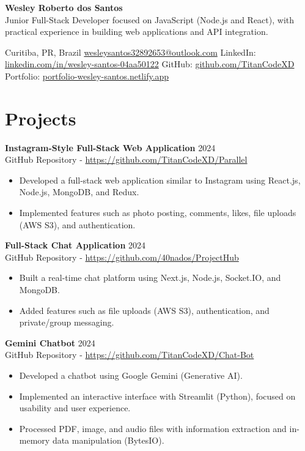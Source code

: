 \documentclass[a4paper, 10pt]{article}
\begin{document}
\begin{center}
    {\Huge \textbf{Wesley Roberto dos Santos}} \\
    \vspace{0.3em}
    \small{Junior Full-Stack Developer focused on JavaScript (Node.js and React), with practical experience in building web applications and API integration.}

    \vspace{0.6em}
    Curitiba, PR, Brazil \quad\textbullet\quad 
    \href{mailto:wesleysantos32892653@outlook.com}{wesleysantos32892653@outlook.com} \quad\textbullet\quad
    LinkedIn: \href{https://www.linkedin.com/in/wesley-santos-04aa50122}{linkedin.com/in/wesley-santos-04aa50122} \quad\textbullet\quad
    GitHub: \href{https://github.com/TitanCodeXD}{github.com/TitanCodeXD} \quad\textbullet\quad
    Portfolio: \href{https://portfolio-wesley-santos.netlify.app}{portfolio-wesley-santos.netlify.app}
\end{center}

\section{Projects}
\textbf{Instagram-Style Full-Stack Web Application} \hfill 2024 \\
GitHub Repository - \href{https://github.com/TitanCodeXD/Parallel}{https://github.com/TitanCodeXD/Parallel}
\begin{itemize}
    \item Developed a full-stack web application similar to Instagram using React.js, Node.js, MongoDB, and Redux.
    \item Implemented features such as photo posting, comments, likes, file uploads (AWS S3), and authentication.
\end{itemize}

\medskip
\textbf{Full-Stack Chat Application} \hfill 2024 \\
GitHub Repository - \href{https://github.com/40nados/ProjectHub}{https://github.com/40nados/ProjectHub}
\begin{itemize}
    \item Built a real-time chat platform using Next.js, Node.js, Socket.IO, and MongoDB.
    \item Added features such as file uploads (AWS S3), authentication, and private/group messaging.
\end{itemize}

\medskip
\textbf{Gemini Chatbot} \hfill 2024 \\
GitHub Repository - \href{https://github.com/TitanCodeXD/Chat-Bot}{https://github.com/TitanCodeXD/Chat-Bot}
\begin{itemize}
    \item Developed a chatbot using Google Gemini (Generative AI).
    \item Implemented an interactive interface with Streamlit (Python), focused on usability and user experience.
    \item Processed PDF, image, and audio files with information extraction and in-memory data manipulation (BytesIO).
\end{itemize}
\end{document}
